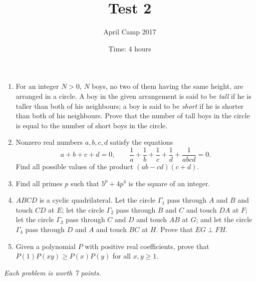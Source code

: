 \documentclass[a4paper,12pt]{article}
\title{Test 2}
\date{Time: 4 hours}
\author{April Camp 2017}
\begin{document}
 \maketitle

\begin{enumerate}
	\item %
	For an integer $N>0$, $N$ boys, no two of them having the same height, are arranged in a circle. A boy in the given arrangement is said to be \emph{tall} if he is taller than both of his neighbours; a boy is said to be \emph{short} if he is shorter than both of his neighbours. Prove that the number of tall boys in the circle is equal to the number of short boys in the circle.
	
	\item %
	Nonzero real numbers $a,b,c,d$ satisfy the equations \[a+b+c+d = 0, \qquad \frac{1}{a}+\frac{1}{b}+\frac{1}{c}+\frac{1}{d}+\frac{1}{abcd} = 0.\]
	Find all possible values of the product $(ab-cd)(c+d)$.

	\item 
	Find all primes $p$ such that $5^p +4p^4$ is the square of an integer.

	\item %
	$ABCD$ is a cyclic quadrilateral. Let the circle $\Gamma_1$ pass through $A$ and $B$ and touch $CD$ at $E$; let the circle $\Gamma_2$ pass through $B$ and $C$ and touch $DA$ at $F$; let the circle $\Gamma_3$ pass through $C$ and $D$ and touch $AB$ at $G$; and let the circle $\Gamma_4$ pass through $D$ and $A$ and touch $BC$ at $H$. Prove that $EG \perp FH$.

	\item %
	Given a polynomial $P$ with positive real coefficients, prove that $P(1)P(xy) \geq P(x)P(y)$ for all $x,y \geq 1$.

\end{enumerate}

\medskip 

\hfill \emph{Each problem is worth 7 points.}
	
\end{document}
